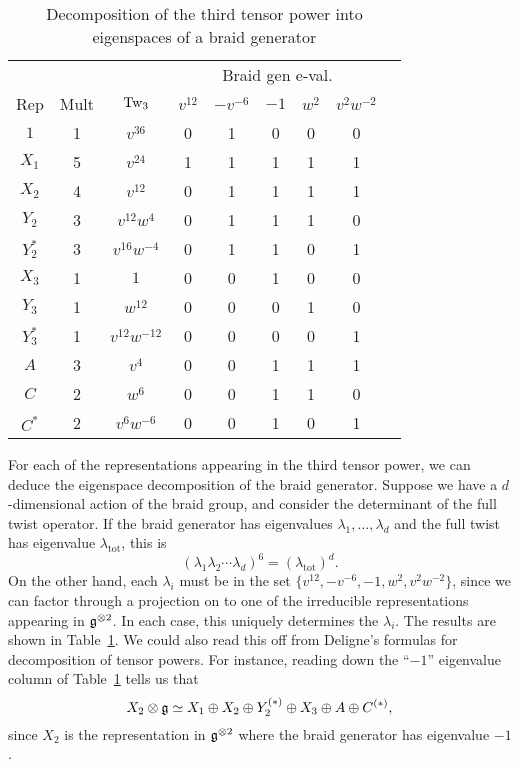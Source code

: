 \documentclass[12pt]{amsart}
\begin{document}
\begin{table}
  \centering
  \begin{tabular}{ccccccccc}
    \toprule
    &&&\multicolumn{5}{c}{Braid gen e-val.} \\ \cmidrule(l){4-8}
    Rep & Mult & $\operatorname{Tw}_3$ & $v^{12}$ & $-v^{-6}$ & $-1$ & $w^2$ & $v^2w^{-2}$ \\
    \midrule
    $1$ & 1 & $v^{36}$ & 0 & 1 & 0 & 0 & 0 \\[2pt]
    $X_1$ & 5 & $v^{24}$ & 1 & 1 & 1 & 1 & 1 \\[2pt]
    $X_2$ & 4 & $v^{12}$ & 0 & 1 & 1 & 1 & 1 \\[2pt]
    $Y_2$ & 3 & $v^{12}w^4$ & 0 & 1 & 1 & 1 & 0 \\[2pt]
    $Y_2^*$ & 3 & $v^{16}w^{-4}$ & 0 & 1 & 1 & 0 & 1 \\[2pt]
    $X_3$ & 1 & $1$ & 0 & 0 & 1 & 0 & 0 \\[2pt]
    $Y_3$ & 1 & $w^{12}$ & 0 & 0 & 0 & 1 & 0 \\[2pt]
    $Y_3^*$ & 1 & $v^{12}w^{-12}$ & 0 & 0 & 0 & 0 & 1 \\[2pt]
    $A$ & 3 & $v^4$ & 0 & 0 & 1 & 1 & 1\\[2pt]
    $C$ & 2 & $w^6$ & 0 & 0 & 1 & 1 & 0\\[2pt]
    $C^*$ & 2 & $v^6w^{-6}$ & 0 & 0 & 1 & 0 & 1\\
    \bottomrule
  \end{tabular}
  \medskip
  \caption{Decomposition of the third tensor power into eigenspaces of a braid generator}\label{tab:braid-gen}
\end{table}

For each of the representations appearing in the third tensor power,
we can deduce the eigenspace decomposition of the braid
generator. Suppose we have a $d$-dimensional action of the braid
group, and consider the determinant of the full twist operator. If the
braid generator has eigenvalues $\lambda_1,\dots,\lambda_d$ and the
full twist has eigenvalue $\lambda_{\text{tot}}$, this is
\[
(\lambda_1\lambda_2\cdots\lambda_d)^6 = (\lambda_{\text{tot}})^d.
\]
On the other hand, each $\lambda_i$ must be in the set
$\{v^{12},-v^{-6},-1,w^2,v^2w^{-2}\}$, since we can factor through a
projection on to one of the irreducible representations appearing in
${\mathfrak g}^{\otimes2}$. In each case, this uniquely determines the
$\lambda_i$. The results are shown in Table~\ref{tab:braid-gen}. We
could also read this off from Deligne's formulas for decomposition of
tensor powers. For instance, reading down the ``$-1$'' eigenvalue
column of Table~\ref{tab:braid-gen} tells us that
\[
X_2 \otimes {\mathfrak g} \simeq X_1 \oplus X_2 \oplus Y_2^{(*)} \oplus X_3
\oplus A \oplus C^{(*)},
\]
since $X_2$ is the representation in ${\mathfrak g}^{\otimes2}$ where the braid
generator has eigenvalue $-1$.
\end{document}
